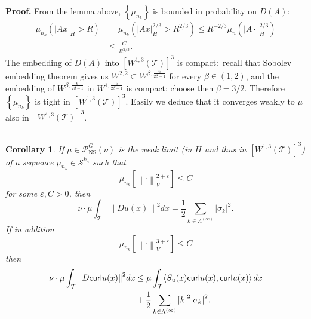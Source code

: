 \documentclass[11pt]{preprint}
\newtheorem{corollary}[theorem]{Corollary}
\newenvironment{proof}[1][Proof]{\textbf{#1.} }{\ \rule{0.5em}{0.5em}}
\begin{document}
\begin{proof}
From the lemma above, $\left\{  \mu_{n_{k}}\right\}  $ is bounded in
probability on $D(A)$:
\begin{align*}
\mu_{n_{k}}\left(  \left|  Ax\right|  _{H}>R\right)   & =\mu_{n_{k}}\left(
\left|  Ax\right|  _{H}^{2/3}>R^{2/3}\right)  \leq R^{-2/3}\mu_{n}\left(
\left|  A\cdot\right|  _{H}^{2/3}\right) \\
& \leq\frac{C}{R^{2/3}}.
\end{align*}
The embedding of $D(A)$ into $\left[  W^{1,3}\left(  \mathcal{T}\right)
\right]  ^{3}$ is compact:\ recall that Sobolev embedding theorem gives us
$W^{2,2}\subset W^{\beta,\frac{6}{2\beta-1}}$ for every $\beta\in\left(
1,2\right)  $, and the embedding of $W^{\beta,\frac{6}{2\beta-1}}$ in
$W^{1,\frac{6}{2\beta-1}}$ is compact; choose then $\beta=3/2$. Therefore
$\left\{  \mu_{n_{k}}\right\}  $ is tight in $\left[  W^{1,3}\left(
\mathcal{T}\right)  \right]  ^{3}$. Easily we deduce that it converges weakly
to $\mu$ also in $\left[  W^{1,3}\left(  \mathcal{T}\right)  \right]  ^{3}$.
\end{proof}

\begin{corollary}
\label{cor:3d-suff-reg}
If $\mu\in\mathcal{P}_{{\mathrm{NS}}}^{G}\left(  \nu\right)  $ is the weak
limit (in $H$ and thus in $\left[  W^{1,3}\left(  \mathcal{T}\right)  \right]
^{3}$) of a sequence $\mu_{n_{k}}\in\mathcal{S}^{k_{n}}$ such that
\[
\mu_{n_{k}}\left[  \left\|  \cdot\right\|  _{V}^{2+\varepsilon}\right]  \leq C
\]
for some $\varepsilon,C>0$, then
\[
\nu\cdot\mu\int_{\mathcal{T}}\left\|  Du\left(  x\right)  \right\|
^{2}dx=\frac{1}{2}\sum_{k\in\Lambda^{(\infty)}}\left|  \sigma_{k}\right|
^{2}.
\]
If in addition
\[
\mu_{n_{k}}\left[  \left\|  \cdot\right\|  _{V}^{3+\varepsilon}\right]  \leq C
\]
then
\begin{align*}
\nu\cdot\mu\int_{\mathcal{T}}\left\|  D\mathsf{curl}u\left(  x\right)
\right\|  ^{2}dx &  \leq\mu\int_{\mathcal{T}}\scal{S_{u}\left( x\right
) \mathsf{curl}u\left( x\right), \mathsf{curl}u\left( x\right)}\,dx\\
&  +\frac{1}{2}\sum_{k\in\Lambda^{(\infty)}}\left|  k\right|  ^{2}\left|
\sigma_{k}\right|  ^{2}.
\end{align*}
\end{corollary}
\end{document}
